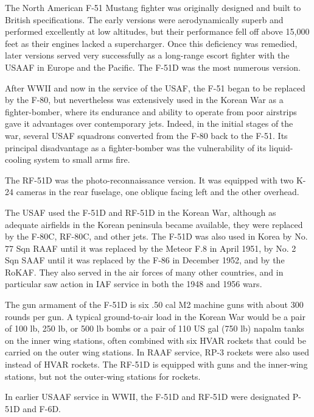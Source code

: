 
The North American F-51 Mustang fighter was originally designed and built to British specifications. The early versions were aerodynamically superb and performed excellently at low altitudes, but their performance fell off above 15,000 feet as their engines lacked a supercharger. Once this deficiency was remedied, later versions served very successfully as a long-range escort fighter with the USAAF in Europe and the Pacific. The F-51D was the most numerous version.

After WWII and now in the service of the USAF, the F-51 began to be replaced by the F-80, but nevertheless was extensively used in the Korean War as a fighter-bomber, where its endurance and ability to operate from poor airstrips gave it advantages over contemporary jets. Indeed, in the initial stages of the war, several USAF squadrons converted from the F-80 back to the F-51. Its principal disadvantage as a fighter-bomber was the vulnerability of its liquid-cooling system to small arms fire.

The RF-51D was the photo-reconnaissance version. It was equipped with two K-24 cameras in the rear fuselage, one oblique facing left and the other overhead.

The USAF used the F-51D and RF-51D in the Korean War, although as adequate airfields in the Korean peninsula became available, they were replaced by the F-80C, RF-80C, and other jets. The F-51D was also used in Korea by No. 77 Sqn RAAF until it was replaced by the Meteor F.8 in April 1951, by No. 2 Sqn SAAF until it was replaced by the F-86 in December 1952, and by the RoKAF. They also served in the air forces of many other countries, and in particular saw action in IAF service in both the 1948 and 1956 wars.

The gun armament of the F-51D is six .50 cal M2 machine guns with about 300 rounds per gun. A typical ground-to-air load in the Korean War would be a pair of 100 lb, 250 lb, or 500 lb bombs or a pair of 110 US gal (750 lb) napalm tanks on the inner wing stations, often combined with six HVAR rockets that could be carried on the outer wing stations. In RAAF service, RP-3 rockets were also used instead of HVAR rockets. The RF-51D is equipped with guns and the inner-wing stations, but not the outer-wing stations for rockets.

In earlier USAAF service in WWII, the F-51D and RF-51D were designated P-51D and F-6D.

\begin{adclist}
\end{adclist}
